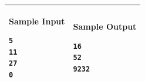 \begin{table}[!h]
\centering
\begin{tabular}{|l|l|}
\hline
\begin{minipage}[t]{3in}
\textbf{Sample Input}
\begin{verbatim}
5
11
27
0
\end{verbatim}
\vspace{1mm}
\end{minipage}
&

\begin{minipage}[t]{3in}
\textbf{Sample Output}
\begin{verbatim}
16
52
9232
\end{verbatim}
\vspace{1mm}
\end{minipage} \\
\hline
\end{tabular}
\end{table}

\newpage
